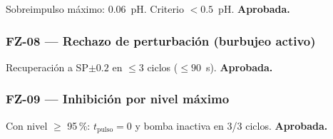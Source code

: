 \noindent Sobreimpulso máximo: 0.06~pH. Criterio $< 0.5$~pH. \textbf{Aprobada.}

\subsubsection*{FZ-08 --- Rechazo de perturbación (burbujeo activo)}

\begin{table}[H]
\centering
\caption{Respuesta ante perturbación por burbujeo activo durante 10~min.}
\label{tab:fz08}
\renewcommand{\arraystretch}{1.3}\small
{}
\end{table}

\noindent Recuperación a SP$\pm 0.2$ en $\leq 3$ ciclos ($\leq 90$~s). \textbf{Aprobada.}

\subsubsection*{FZ-09 --- Inhibición por nivel máximo}

\begin{table}[H]
\centering
\caption{Inhibición del control de pH al superar el nivel máximo.}
\label{tab:fz09}
\renewcommand{\arraystretch}{1.3}\small
{}
\end{table}

\noindent Con nivel $\geq$ 95\,\%: $t_\text{pulso} = 0$ y bomba inactiva en 3/3 ciclos.
\textbf{Aprobada.}

